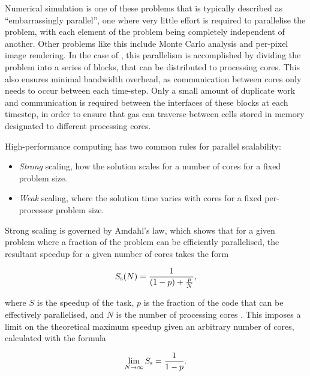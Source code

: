 Numerical simulation is one of these problems that is typically described as ``embarrassingly parallel'', one where very little effort is required to parallelise the problem, with each element of the problem being completely independent of another.
Other problems like this include Monte Carlo analysis and per-pixel image rendering.
In the case of \athena{}, this parallelism is accomplished by dividing the problem into a series of blocks, that can be distributed to processing cores.
This also ensures minimal bandwidth overhead, as communication between cores only needs to occur between each time-step.
Only a small amount of duplicate work and communication is required between the interfaces of these blocks at each timestep, in order to ensure that gas can traverse between cells stored in memory designated to different processing cores.

High-performance computing has two common rules for parallel scalability:

\begin{itemize}
  \item \emph{Strong} scaling, how the solution scales for a number of cores for a fixed problem size. 
  \item \emph{Weak} scaling, where the solution time varies with cores for a fixed per-processor problem size.
\end{itemize}

\noindent
Strong scaling is governed by Amdahl's law, which shows that for a given problem where a fraction of the problem can be efficiently parallelised, the resultant speedup for a given number of cores takes the form

\begin{equation}
  S_\text{s}(N) = \frac{1}{(1-p) + \frac{p}{N}},
\end{equation}

\noindent
where $S$ is the speedup of the task, $p$ is the fraction of the code that can be effectively parallelised, and $N$ is the number of processing cores \parencite{amdahlValiditySingleProcessor1967}.
This imposes a limit on the theoretical maximum speedup given an arbitrary number of cores, calculated with the formula

\begin{equation}
  \lim_{N \rightarrow \infty} S_\text{s} = \frac{1}{1-p} .
\end{equation}

